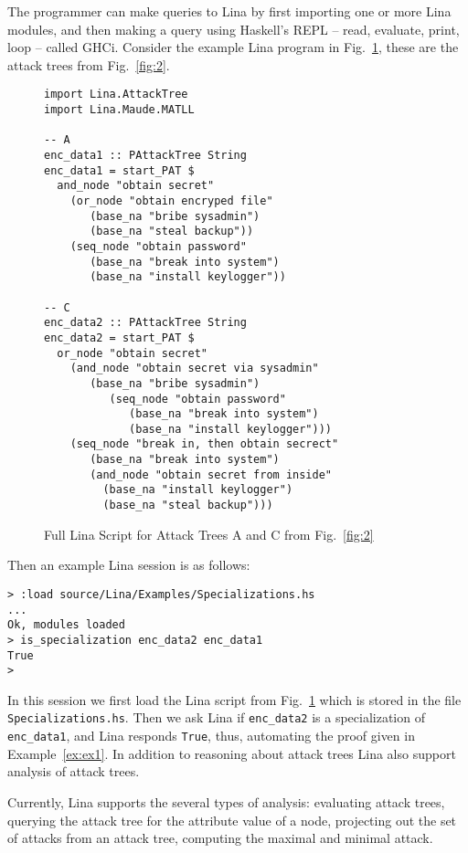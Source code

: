The programmer can make queries to Lina by first importing one or more
Lina modules, and then making a query using Haskell's REPL -- read,
evaluate, print, loop -- called GHCi.  Consider the example Lina
program in Fig.~\ref{fig:lina-script-encrypt}, these are the attack
trees from Fig.~\ref{fig:2}.
\begin{figure}
  \begin{mdframed}
\begin{verbatim}
import Lina.AttackTree
import Lina.Maude.MATLL

-- A
enc_data1 :: PAttackTree String
enc_data1 = start_PAT $
  and_node "obtain secret"
    (or_node "obtain encryped file"
       (base_na "bribe sysadmin")
       (base_na "steal backup"))
    (seq_node "obtain password"
       (base_na "break into system")
       (base_na "install keylogger"))

-- C
enc_data2 :: PAttackTree String
enc_data2 = start_PAT $
  or_node "obtain secret"
    (and_node "obtain secret via sysadmin"
       (base_na "bribe sysadmin")
          (seq_node "obtain password"
             (base_na "break into system")
             (base_na "install keylogger")))
    (seq_node "break in, then obtain secrect"
       (base_na "break into system")
       (and_node "obtain secret from inside"
         (base_na "install keylogger")
         (base_na "steal backup")))
    \end{verbatim}
  \end{mdframed}
  \caption{Full Lina Script for Attack Trees A and C from Fig.~\ref{fig:2}}
  \label{fig:lina-script-encrypt}
\end{figure}
Then an example Lina session is as follows:
\begin{mdframed}\scriptsize
  \begin{verbatim}
> :load source/Lina/Examples/Specializations.hs
...
Ok, modules loaded
> is_specialization enc_data2 enc_data1
True
>     
  \end{verbatim}
\end{mdframed}
In this session we first load the Lina script from
Fig.~\ref{fig:lina-script-encrypt} which is stored in the file
\verb!Specializations.hs!.  Then we ask Lina if \verb!enc_data2! is a
specialization of \verb!enc_data1!, and Lina responds \verb!True!,
thus, automating the proof given in Example~\ref{ex:ex1}.  In addition
to reasoning about attack trees Lina also support analysis of attack
trees.

Currently, Lina supports the several types of analysis: evaluating
attack trees, querying the attack tree for the attribute value of a
node, projecting out the set of attacks from an attack tree, computing
the maximal and minimal attack.

